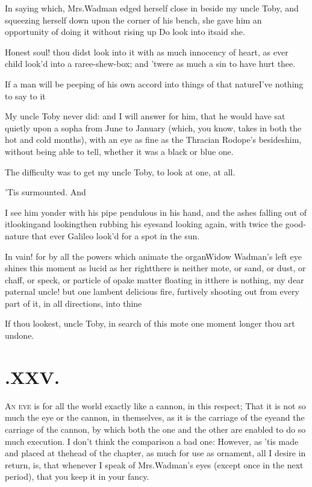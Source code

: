 \documentclass{article}
\begin{document}
In saying which, Mrs.\@ Wadman edged herself close in
beside my uncle Toby, and squeezing herself down upon the
corner of his bench, she gave him an opportunity of doing it without rising up 
\tsh Do look into it\tsk said she.

\newpage
Honest soul! thou didst look into it with as much innocency of
heart, as ever child look’d into a raree-shew-box; and
’twere as much a sin to have hurt thee.

\tsh If a man will be peeping of his own accord into
things of that nature\tsh I’ve nothing to say to
it\tsh


My uncle Toby never did: and I will answer for him, that he would have sat quietly
upon a sopha from June to January (which, you know, takes in both the hot and cold
months), with an eye as fine as the Thracian  Rodope’s
besides\pb him, without being able to tell, whether it was a black or blue one.

The difficulty was to get my uncle Toby, to look at one,
at all.

’Tis surmounted. And

I see him yonder with his pipe pendulous in his hand, and the
ashes falling out of it\tsk looking\tsk and looking\tsk then
rubbing his eyes\tsh and looking again, with twice the
good-nature that ever Galileo look’d for a spot in the
sun.

\tsh In vain! for by all the powers\break
which animate the organ\tsk Widow\break
Wadman’s left eye shines this
moment as lucid as her right\tsk there is neither mote, or
sand, or dust, or chaff, or speck, or particle of opake matter
floating in it\pb\tsk there is nothing, my dear paternal uncle! but
one lambent delicious fire, furtively shooting out from every part
of it, in all directions, into thine\tsh

\tsh If thou lookest, uncle Toby, in\break
search of this mote one moment longer\break
\tsh thou art undone.


\section{.\enspace XXV.}

\lettrine{A}{n eye} is for all the world exactly like a cannon, in this respect;
That it is not so much the eye or the cannon, in themselves, as it is the carriage
of the eye\tsh and the carriage of the cannon, by which both the one and the other
are enabled to do so much execution. I don’t think the comparison a bad one:
However, as ’tis made and placed at the\pb head of the chapter, as much for use as
ornament, all I desire in return, is, that whenever I speak of Mrs.\@ Wadman’s eyes
(except once in the next period), that you keep it in your fancy.
\end{document}
